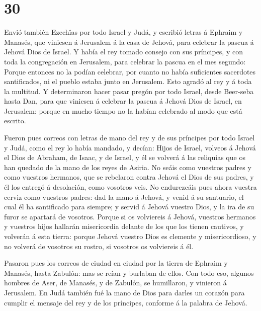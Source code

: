 \hypertarget{section-14-30}{%
\section{30}\label{section-14-30}}

 Envió también Ezechîas por todo Israel y Judá, y escribió
letras á Ephraim y Manasés, que viniesen á Jerusalem á la casa de
Jehová, para celebrar la pascua á Jehová Dios de Israel. 
Y había el rey tomado consejo con sus príncipes, y con toda la
congregación en Jerusalem, para celebrar la pascua en el mes segundo:
 Porque entonces no la podían celebrar, por cuanto no
había suficientes sacerdotes santificados, ni el pueblo estaba junto en
Jerusalem.  Esto agradó al rey y á toda la multitud.
 Y determinaron hacer pasar pregón por todo Israel, desde
Beer-seba hasta Dan, para que viniesen á celebrar la pascua á Jehová
Dios de Israel, en Jerusalem: porque en mucho tiempo no la habían
celebrado al modo que está escrito.

 Fueron pues correos con letras de mano del rey y de sus
príncipes por todo Israel y Judá, como el rey lo había mandado, y
decían: Hijos de Israel, volveos á Jehová el Dios de Abraham, de Isaac,
y de Israel, y él se volverá á las reliquias que os han quedado de la
mano de los reyes de Asiria.  No seáis como vuestros
padres y como vuestros hermanos, que se rebelaron contra Jehová el Dios
de sus padres, y él los entregó á desolación, como vosotros veis.
 No endurezcáis pues ahora vuestra cerviz como vuestros
padres: dad la mano á Jehová, y venid á su santuario, el cual él ha
santificado para siempre; y servid á Jehová vuestro Dios, y la ira de su
furor se apartará de vosotros.  Porque si os volviereis á
Jehová, vuestros hermanos y vuestros hijos hallarán misericordia delante
de los que los tienen cautivos, y volverán á esta tierra: porque Jehová
vuestro Dios es clemente y misericordioso, y no volverá de vosotros su
rostro, si vosotros os volviereis á él.

 Pasaron pues los correos de ciudad en ciudad por la
tierra de Ephraim y Manasés, hasta Zabulón: mas se reían y burlaban de
ellos.  Con todo eso, algunos hombres de Aser, de
Manasés, y de Zabulón, se humillaron, y vinieron á Jerusalem.
 En Judá también fué la mano de Dios para darles un
corazón para cumplir el mensaje del rey y de los príncipes, conforme á
la palabra de Jehová.


